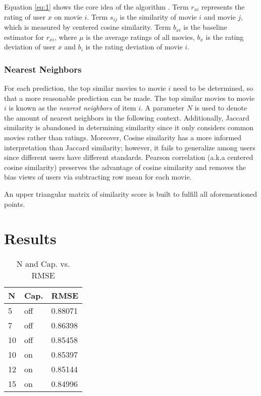 \documentclass{ece}
\begin{document}
Equation \eqref{eq:1} shows the core idea of the algorithm \cite{mmds_org}.
Term $r_{xi}$ represents the rating of user $x$ on movie $i$.
Term $s_{ij}$ is the similarity of movie $i$ and movie $j$, which is measured by centered cosine similarity.
Term $b_{xi}$ is the baseline estimator for $r_{xi}$, where $\mu$ is the average ratings of all movies, $b_x$ is the rating deviation of user $x$ and $b_i$ is the rating deviation of movie $i$.

\subsubsection{Nearest Neighbors}
\label{knn}
For each prediction, the top similar movies to movie $i$ need to be determined, so that a more reasonable prediction can be made.
The top similar movies to movie $i$ is known as the \textit{nearest neighbors} of item $i$.
A parameter $N$ is used to denote the amount of nearest neighbors in the following context.
Additionally, Jaccard similarity is abandoned in determining similarity since it only considers common movies rather than ratings.
Moreover, Cosine similarity has a more informed interpretation than Jaccard similarity; however, it fails to generalize among users since different users have different standards.
Pearson correlation (a.k.a centered cosine similarity) preserves the advantage of cosine similarity and removes the bias views of users via subtracting row mean for each movie.

An upper triangular matrix of similarity score is built to fulfill all aforementioned points.

\section{Results}

\begin{table}[ht!]
    \caption[N and Cap. vs. RMSE]{N and Cap. vs. RMSE}
    \label{tab:table-2}
    \centering
\begin{tabular}{|l|l|l|}
\hline
N  & Cap. & RMSE    \\ \hline
5  & off  & 0.88071 \\ \hline
7  & off  & 0.86398 \\ \hline
10 & off  & 0.85458 \\ \hline
10 & on   & 0.85397 \\ \hline
12 & on   & 0.85144 \\ \hline
15 & on   & 0.84996 \\ \hline
\end{tabular}
\end{table}
\end{document}
